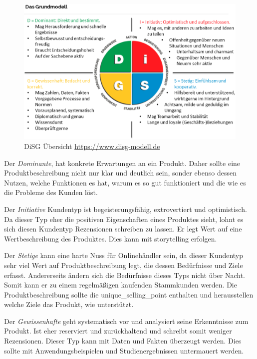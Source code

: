 \begin{figure}[!ht]
	\centering
	\includegraphics[width=\linewidth]{images/chapter3/disg-uebersicht.eps}
	\caption{DiSG Übersicht \href{https://www.disg-modell.de/persoenlichkeitsorientiertes-lernen-mit-dem-disg-modell}{https://www.disg-modell.de}}
	\label{img:disg_overview}
\end{figure}

Der \textit{Dominante}, hat konkrete Erwartungen an ein Produkt. Daher sollte eine Produktbeschreibung nicht nur klar und deutlich sein, sonder ebenso dessen Nutzen, welche Funktionen es hat, warum es so gut funktioniert und die wie es die Probleme des Kunden löst.\vspace{0.2cm}

Der \textit{Initiative} Kundentyp ist begeisterungsfähig, extrovertiert und optimistisch. Da dieser Typ eher die positiven Eigenschaften eines Produktes sieht, lohnt es sich diesen Kundentyp Rezensionen schreiben zu lassen. Er legt Wert auf eine Wertbeschreibung des Produktes. Dies kann mit \Gls{storytelling} erfolgen.\vspace{0.2cm}

Der \textit{Stetige} kann eine harte Nuss für Onlinehändler sein, da dieser Kundentyp sehr viel Wert auf Produktbeschreibung legt, die dessen Bedürfnisse und Ziele erfasst. Andererseits ändern sich die Bedürfnisse dieses Typs nicht über Nacht. Somit kann er zu einem regelmäßigen kaufenden Stammkunden werden. Die Produktbeschreibung sollte die \Gls{unique_selling_point} enthalten und herausstellen welche Ziele das Produkt, wie unterstützt.\vspace{0.2cm}

Der \textit{Gewissenhafte} geht systematisch vor und analysiert seine Erkenntnisse zum Produkt. Ist eher reserviert und zurückhaltend und schreibt somit weniger Rezensionen. Dieser Typ kann mit Daten und Fakten überzeugt werden. Dies sollte mit Anwendungsbeispielen und Studienergebnissen untermauert werden.

